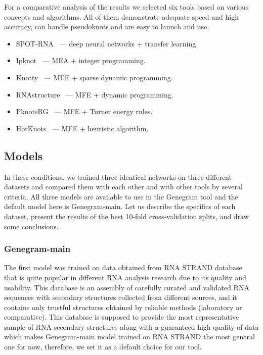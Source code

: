 For a comparative analysis of the results we selected six tools based on various concepts and algorithms. All of them demonstrate adequate speed and high accuracy, can handle pseudoknots and are easy to launch and use.

\begin{itemize}
    \item SPOT-RNA~\cite{singh2019rna} --- deep neural networks + transfer learning.
    \item Ipknot~\cite{sato2011ipknot} --- MEA + integer programming.
    \item Knotty~\cite{jabbari2018knotty} --- MFE + sparse dynamic programming.
    \item RNAstructure~\cite{bellaousov2013rnastructure} --- MFE + dynamic programming. 
    \item PknotsRG~\cite{reeder2007pknotsrg} --- MFE + Turner energy rules.
    \item HotKnots~\cite{ren2005hotknots} --- MFE + heuristic algorithm.
\end{itemize}

\subsection{Models}
In these conditions, we trained three identical networks on three different datasets and compared them with each other and with other tools by several criteria. All three models are available to use in the Genegram tool and the default model here is Genegram-main. Let us describe the specifics of each dataset, present the results of the best 10-fold cross-validation splits, and draw some conclusions.

\subsubsection{Genegram-main}
The first model was trained on data obtained from RNA STRAND database~\cite{andronescu2008rna} that is quite popular in different RNA analysis research due to its quality and usability. This database is an assembly of carefully curated and validated RNA sequences with secondary structures collected from different sources, and it contains only trustful structures obtained by reliable methods (laboratory or comparative). This database is supposed to provide the most representative sample of RNA secondary structures along with a guaranteed high quality of data which makes Genegram-main model trained on RNA STRAND the most general one for now, therefore, we set it as a default choice for our tool.


